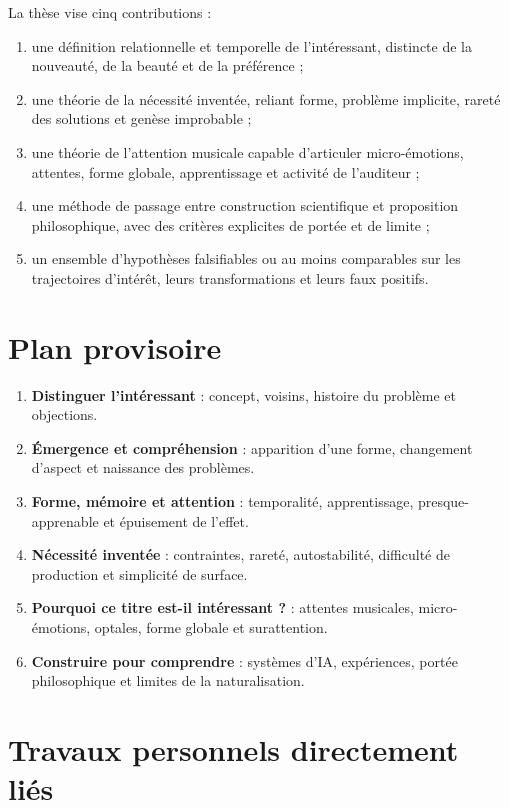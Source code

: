 \documentclass[11pt,a4paper]{article}
\begin{document}
La thèse vise cinq contributions :

\begin{enumerate}
  \item une définition relationnelle et temporelle de l'intéressant, distincte
        de la nouveauté, de la beauté et de la préférence ;
  \item une théorie de la nécessité inventée, reliant forme, problème implicite,
        rareté des solutions et genèse improbable ;
  \item une théorie de l'attention musicale capable d'articuler micro-émotions,
        attentes, forme globale, apprentissage et activité de l'auditeur ;
  \item une méthode de passage entre construction scientifique et proposition
        philosophique, avec des critères explicites de portée et de limite ;
  \item un ensemble d'hypothèses falsifiables ou au moins comparables sur les
        trajectoires d'intérêt, leurs transformations et leurs faux positifs.
\end{enumerate}

\section{Plan provisoire}

\begin{enumerate}
  \item \textbf{Distinguer l'intéressant} : concept, voisins, histoire du
        problème et objections.
  \item \textbf{Émergence et compréhension} : apparition d'une forme,
        changement d'aspect et naissance des problèmes.
  \item \textbf{Forme, mémoire et attention} : temporalité, apprentissage,
        presque-apprenable et épuisement de l'effet.
  \item \textbf{Nécessité inventée} : contraintes, rareté, autostabilité,
        difficulté de production et simplicité de surface.
  \item \textbf{Pourquoi ce titre est-il intéressant ?} : attentes musicales,
        micro-émotions, optales, forme globale et surattention.
  \item \textbf{Construire pour comprendre} : systèmes d'IA, expériences,
        portée philosophique et limites de la naturalisation.
\end{enumerate}

\section{Travaux personnels directement liés}
\end{document}

